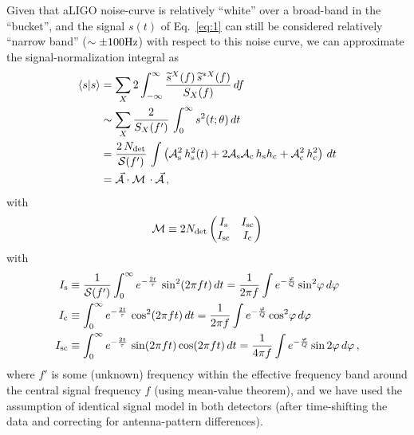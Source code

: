 \documentclass[aps,prd,onecolumn,notitlepage,nofootinbib,superscriptaddress,altaffilletter,floatfix]{revtex4-1}
\begin{document}
Given that aLIGO noise-curve is relatively ``white'' over a broad-band in the ``bucket'', and the signal $s(t)$ of Eq.~\eqref{eq:1} can still be
considered relatively ``narrow band'' ($\sim \pm 100\mathrm{Hz}$) with respect to this noise curve, we can approximate the signal-normalization integral as
\begin{align}
  \label{eq:17}
  \langle s|s\rangle &= \sum_X 2 \int_{-\infty}^{\infty} \frac{\widetilde{s}^X(f)\,\widetilde{s}^{*X}(f)}{S_X(f)}\,d f\\
  &\sim \sum_X \frac{2}{S_X(f')} \, \int_{0}^{\infty} s^2(t;\theta)\,dt\\
  & = \frac{2\,N_{\mathrm{det}}}{\mathcal{S}(f')} \,\int \left( \mathcal{A}_{\mathrm{s}}^2\,h_\mathrm{s}^2(t) + 2\mathcal{A}_{\mathrm{s}}\mathcal{A}_{\mathrm{c}}\,h_\mathrm{s}h_\mathrm{c} + \mathcal{A}_{\mathrm{c}}^2\,h_\mathrm{c}^2\right)\,d t\\
  & = \vec{\mathcal{A}} \cdot \mathcal{M} \,\cdot\vec{\mathcal{A}}\,,
\end{align}
with
\begin{equation}
  \label{eq:23}
  \mathcal{M} \equiv
  2N_{\mathrm{det}} \begin{pmatrix}
    I_{\mathrm{s}}  & I_{\mathrm{sc}} \\
    I_{\mathrm{sc}}  & I_{\mathrm{c}}\\
  \end{pmatrix}
\end{equation}
with
\begin{align}
  \label{eq:43}
  I_{\mathrm{s}}  &\equiv \frac{1}{\mathcal{S}(f')}\int_0^\infty e^{-\frac{2t}{\tau}}\,\sin^2(2\pi f t)\,dt = \frac{1}{2\pi f}\int e^{-\frac{\varphi}{Q}} \sin^2\!\varphi\,d\varphi\\
  I_{\mathrm{c}}  &\equiv \int_0^\infty e^{-\frac{2t}{\tau}}\,\cos^2(2\pi f t)\,dt = \frac{1}{2\pi f}\int e^{-\frac{\varphi}{Q}} \cos^2\!\varphi\,d\varphi\\
  I_{\mathrm{sc}} &\equiv \int_0^\infty e^{-\frac{2t}{\tau}}\,\sin(2\pi f t)\cos(2\pi f t)\,dt = \frac{1}{4\pi f}\int e^{-\frac{\varphi}{Q}} \sin2\varphi\,d\varphi\,,
\end{align}
where $f'$ is some (unknown) frequency within the effective frequency band around the central signal frequency $f$ (using mean-value theorem), and we
have used the assumption of identical signal model in both detectors (after time-shifting the data and correcting for antenna-pattern differences).
\end{document}
